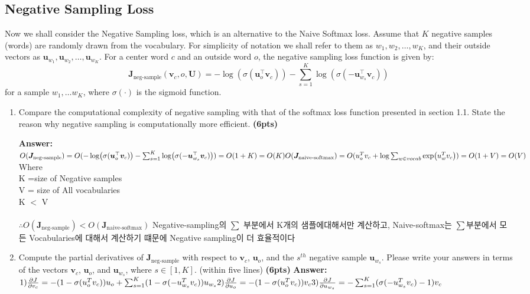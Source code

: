 \documentclass{assignment format}
\newenvironment{answer}{
    {\bf Answer:} \begingroup\color{red}
}{\endgroup}%
\begin{document}
\subsection{Negative Sampling Loss}
Now we shall consider the Negative Sampling loss, which is an alternative to the Naive Softmax loss.  Assume that $K$ negative samples (words) are randomly drawn from the vocabulary. For simplicity of notation we shall refer to them as $w_1, w_2, \dots, w_K$, and their outside vectors as $\bm u_{w_1}, \bm u_{w_2}, \dots, \bm u_{w_K}$. 
For a center word $c$ and an outside word $o$, the negative sampling loss function is given by:
\begin{equation}
\bm J_{\text{neg-sample}}(\bm v_c, o, \bm U) = -\log(\sigma(\bm u_o^\top \bm v_c)) - \sum_{s=1}^K \log(\sigma(-\bm u_{w_s}^\top \bm v_c))
\label{negsample}
\end{equation}
for a sample $w_1, \ldots w_K$, where $\sigma(\cdot)$ is the sigmoid function.
\begin{enumerate}[label=(\alph*)]
\item Compare the computational complexity of negative sampling with that of the softmax loss function presented in section 1.1. State the reason why negative sampling is computationally more efficient. \textbf{(6pts)}

\begin{answer} \\
$O(\bm J_{\text{neg-sample}}) = 
O(-\log(\sigma(\bm u_o^\top \bm v_c)) - \sum_{s=1}^K \log(\sigma(-\bm u_{w_s}^\top \bm v_c))) =
O(1+K) = O(K) \\
O(\bm J_{\text{naive-softmax}}) = 
O(u_o^T v_c+\log\sum_{w\in vocab}\exp(u_w^Tv_c))
= O(1+V) = O(V) \\
$
\\
Where \\
K =size of Negative samples \\
V = size of All vocabularies \\ 
K $<$ V \\
\\
$\therefore O(\bm J_{\text{neg-sample}}) < O(\bm J_{\text{naive-softmax}})  $ 
Negative-sampling의 $\sum$ 부분에서 K개의 샘플에대해서만 계산하고, Naive-softmax는 $\sum$부분에서 모든 Vocabularies에 대해서 계산하기 떄문에 Negative sampling이 더 효율적이다
    \end{answer}
\item Compute the partial derivatives of $\bm J_{\text{neg-sample}}$ with respect to $\bm v_c$, $\bm u_o$, and the $s^{th}$ negative sample $\bm u_{w_s}$. Please write your answers in terms of the vectors $\bm v_c$, $\bm u_o$, and $\bm u_{w_s}$, where $s \in [1, K]$.
 (within five lines)
\textbf{(6pts)}
\begin{answer}\\
$
1)\pdv{J}{v_c} = 
-(1-\sigma(u_o^T v_c))u_o + \sum_{s=1}^K(1-\sigma(-u_{w_s}^T v_c))u_{w_s}\\
2)\pdv{J}{u_o} = 
-(1-\sigma(u_o^T v_c))v_c\\
3)\pdv{J}{u_{w_s}} = 
-\sum_{s=1}^K(\sigma(-u_{w_s}^T v_c) -1)v_c\\
$
    \end{answer}
\end{enumerate}
\end{document}
